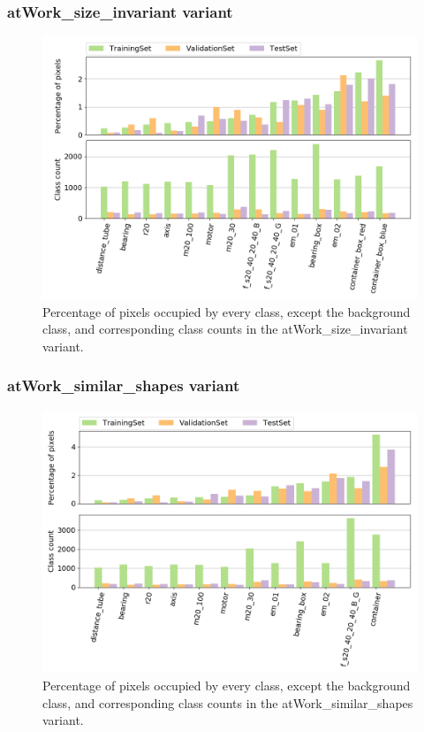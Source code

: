 	\subsubsection{atWork\_size\_invariant variant}
		
		\begin{figure}
		\centering
			\includegraphics[scale=0.5]{images/size_noB}
			\caption{Percentage of pixels occupied by every class, except the background class, and corresponding class counts in the atWork\_size\_invariant variant.}
			\label{Fig:ana_size}
		\end{figure}
		
	\subsubsection{atWork\_similar\_shapes variant}
		
		\begin{figure}
		\centering
			\includegraphics[scale=0.5]{images/shape_noB}
			\caption{Percentage of pixels occupied by every class, except the background class, and corresponding class counts in the atWork\_similar\_shapes variant.}
			\label{Fig:ana_shape}
		\end{figure}
		
